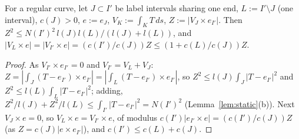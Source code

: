 \begin{lemma}\label{lem:Ns}
For a regular curve, let $J\subset I'$ be label intervals sharing one end, $L:=I'\setminus J$ (one interval), $c(J)>0$,
$e:=e_J$, $V_K:=\int_KT\,ds$, $Z:=|V_J\times e_{I'}|$. Then $Z^2\le N(I')^2\,l(J)l(L)/(l(J)+l(L))$, and
$|V_L\times e|=|V_{I'}\times e|=(c(I')/c(J))Z\le(1+c(L)/c(J))Z$.
\end{lemma}
\begin{proof}
As $V_{I'}\times e_{I'}=0$ and $V_{I'}=V_L+V_J$: $Z=|\int_J(T-e_{I'})\times e_{I'}|=|\int_L(T-e_{I'})\times e_{I'}|$, so
$Z^2\le l(J)\int_J|T-e_{I'}|^2$ and $Z^2\le l(L)\int_L|T-e_{I'}|^2$; adding,
$Z^2/l(J)+Z^2/l(L)\le\int_{I'}|T-e_{I'}|^2=N(I')^2$ (Lemma~\ref{lem:static}(b)). Next $V_J\times e=0$, so
$V_L\times e=V_{I'}\times e$, of modulus $c(I')|e_{I'}\times e|=(c(I')/c(J))Z$ (as $Z=c(J)|e\times e_{I'}|$), and
$c(I')\le c(L)+c(J)$.
\end{proof}

